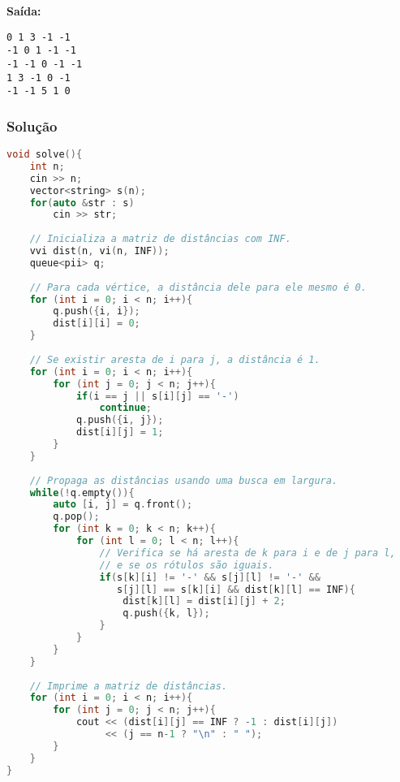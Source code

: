 \textbf{Saída:}
\begin{verbatim}
0 1 3 -1 -1
-1 0 1 -1 -1
-1 -1 0 -1 -1
1 3 -1 0 -1
-1 -1 5 1 0
\end{verbatim}

\subsubsection*{Solução}
\begin{lstlisting}[language=C++]
void solve(){
    int n;
    cin >> n;
    vector<string> s(n);
    for(auto &str : s)
        cin >> str;
    
    // Inicializa a matriz de distâncias com INF.
    vvi dist(n, vi(n, INF));
    queue<pii> q;
    
    // Para cada vértice, a distância dele para ele mesmo é 0.
    for (int i = 0; i < n; i++){
        q.push({i, i});
        dist[i][i] = 0;
    }
    
    // Se existir aresta de i para j, a distância é 1.
    for (int i = 0; i < n; i++){
        for (int j = 0; j < n; j++){
            if(i == j || s[i][j] == '-')
                continue;
            q.push({i, j});
            dist[i][j] = 1;
        }
    }
    
    // Propaga as distâncias usando uma busca em largura.
    while(!q.empty()){
        auto [i, j] = q.front();
        q.pop();
        for (int k = 0; k < n; k++){
            for (int l = 0; l < n; l++){
                // Verifica se há aresta de k para i e de j para l,
                // e se os rótulos são iguais.
                if(s[k][i] != '-' && s[j][l] != '-' &&
                   s[j][l] == s[k][i] && dist[k][l] == INF){
                    dist[k][l] = dist[i][j] + 2;
                    q.push({k, l});
                }
            }
        }
    }
    
    // Imprime a matriz de distâncias.
    for (int i = 0; i < n; i++){
        for (int j = 0; j < n; j++){
            cout << (dist[i][j] == INF ? -1 : dist[i][j])
                 << (j == n-1 ? "\n" : " ");
        }
    }
}
\end{lstlisting}